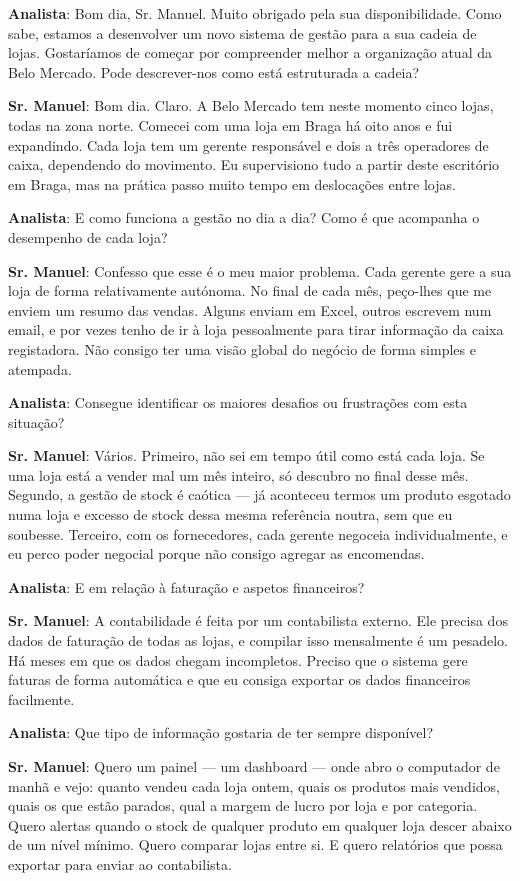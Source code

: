 \documentclass[a4paper,12pt]{scrreprt}
\begin{document}
\textbf{Analista}: Bom dia, Sr. Manuel. Muito obrigado pela sua disponibilidade. Como sabe, estamos a desenvolver um novo sistema de gestão para a sua cadeia de lojas. Gostaríamos de começar por compreender melhor a organização atual da Belo Mercado. Pode descrever-nos como está estruturada a cadeia?

\textbf{Sr. Manuel}: Bom dia. Claro. A Belo Mercado tem neste momento cinco lojas, todas na zona norte. Comecei com uma loja em Braga há oito anos e fui expandindo. Cada loja tem um gerente responsável e dois a três operadores de caixa, dependendo do movimento. Eu supervisiono tudo a partir deste escritório em Braga, mas na prática passo muito tempo em deslocações entre lojas.

\textbf{Analista}: E como funciona a gestão no dia a dia? Como é que acompanha o desempenho de cada loja?

\textbf{Sr. Manuel}: Confesso que esse é o meu maior problema. Cada gerente gere a sua loja de forma relativamente autónoma. No final de cada mês, peço-lhes que me enviem um resumo das vendas. Alguns enviam em Excel, outros escrevem num email, e por vezes tenho de ir à loja pessoalmente para tirar informação da caixa registadora. Não consigo ter uma visão global do negócio de forma simples e atempada.

\textbf{Analista}: Consegue identificar os maiores desafios ou frustrações com esta situação?

\textbf{Sr. Manuel}: Vários. Primeiro, não sei em tempo útil como está cada loja. Se uma loja está a vender mal um mês inteiro, só descubro no final desse mês. Segundo, a gestão de stock é caótica --- já aconteceu termos um produto esgotado numa loja e excesso de stock dessa mesma referência noutra, sem que eu soubesse. Terceiro, com os fornecedores, cada gerente negoceia individualmente, e eu perco poder negocial porque não consigo agregar as encomendas.

\textbf{Analista}: E em relação à faturação e aspetos financeiros?

\textbf{Sr. Manuel}: A contabilidade é feita por um contabilista externo. Ele precisa dos dados de faturação de todas as lojas, e compilar isso mensalmente é um pesadelo. Há meses em que os dados chegam incompletos. Preciso que o sistema gere faturas de forma automática e que eu consiga exportar os dados financeiros facilmente.

\textbf{Analista}: Que tipo de informação gostaria de ter sempre disponível?

\textbf{Sr. Manuel}: Quero um painel --- um dashboard --- onde abro o computador de manhã e vejo: quanto vendeu cada loja ontem, quais os produtos mais vendidos, quais os que estão parados, qual a margem de lucro por loja e por categoria. Quero alertas quando o stock de qualquer produto em qualquer loja descer abaixo de um nível mínimo. Quero comparar lojas entre si. E quero relatórios que possa exportar para enviar ao contabilista.
\end{document}
